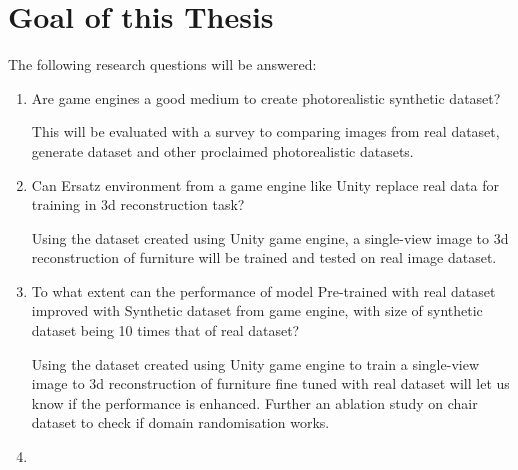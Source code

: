 \section{Goal of this Thesis}\label{ss:goal}

The following research questions will be answered:
\begin{enumerate}
    \item Are game engines a good medium to create photorealistic synthetic dataset?

    This will be evaluated with a survey to comparing images from real dataset, generate dataset and other proclaimed photorealistic datasets.
    \item Can Ersatz environment from a game engine like Unity replace real data for training in 3d reconstruction task?

    Using the dataset created using Unity game engine, a single-view image to 3d reconstruction of furniture will be trained and tested on real image dataset.

    \item To what extent can the performance of model Pre-trained with real dataset improved with Synthetic dataset from game engine,
            with size of synthetic dataset being 10 times that of real dataset?

    Using the dataset created using Unity game engine to train a single-view image to 3d reconstruction of furniture fine tuned with real dataset will let us know if the performance is enhanced.
    Further an ablation study on chair dataset to check if domain randomisation works.

    \item {}
\end{enumerate}

